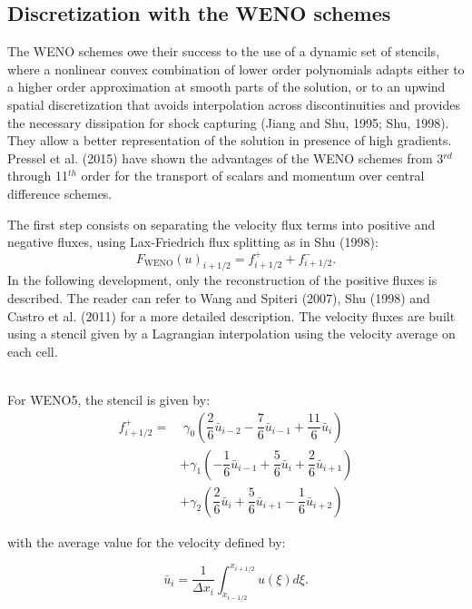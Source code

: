 \subsection{Discretization with the WENO schemes}
The WENO schemes owe their success to the use of a dynamic set of stencils, where a nonlinear convex combination of lower order polynomials adapts either to a higher order approximation at smooth parts of the solution, or to an upwind spatial discretization that avoids interpolation across discontinuities and provides the necessary dissipation for shock capturing (Jiang and Shu, 1995; Shu, 1998). They allow a better representation of the solution in presence of high 
    gradients. Pressel et al. (2015) have shown the advantages of the WENO schemes from 3$^{rd}$ through 11$^{th}$ order for the transport of scalars and momentum over central difference schemes.

The first step consists on separating the velocity flux terms into positive and negative fluxes, using Lax-Friedrich flux splitting as in Shu (1998):
\begin{equation}
F_{\mbox{WENO}}(u)_{i+1/2} = f^{+}_{i+1/2} + f^{-}_{i+1/2}.
\label{eq:flux-splitting}
\end{equation}
In the following development, only the reconstruction of the positive fluxes is described. The reader can refer to Wang and Spiteri (2007), Shu (1998) and Castro et al. (2011) for a more detailed description. The velocity fluxes are built using a stencil given by a Lagrangian interpolation using the velocity average on each cell.

~\\
For WENO5, the stencil is given by:
\begin{equation}
\begin{split}
 f^+_{i+1/2} =& \; \gamma_0 \left( \dfrac{2}{6} \bar{u}_{i-2} - \dfrac{7}{6} \bar{u}_{i-1} + \dfrac{11}{6} \bar{u}_{i} 
 \right) \\
 &+ \gamma_1 \left(-\dfrac{1}{6} \bar{u}_{i-1} + \dfrac{5}{6} \bar{u}_{i}   + \dfrac{2}{6} \bar{u}_{i+1} \right) \\ 
 &+ \gamma_2 \left( \dfrac{2}{6} \bar{u}_{i}   + \dfrac{5}{6} \bar{u}_{i+1} - \dfrac{1}{6} \bar{u}_{i+2} \right)     
\end{split}    
\end{equation}

with the average value for the velocity defined by:

\begin{equation}
 \bar{u}_i = \dfrac{1}{\Delta x_i} \int_{x_{i-1/2}}^{x_{i+1/2}} u(\xi)d\xi.
\end{equation}

